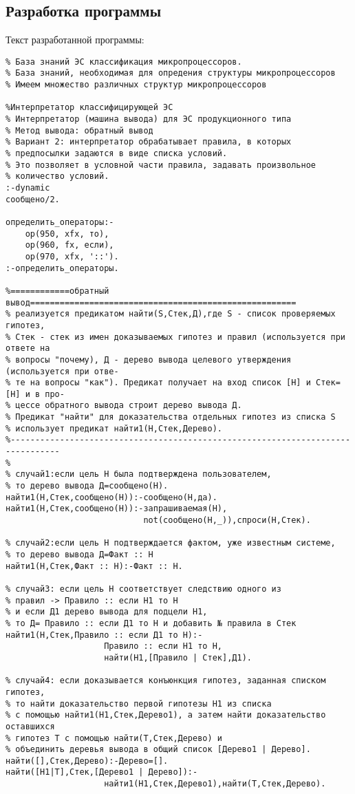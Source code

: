 \documentclass[a4paper,14pt]{extarticle}
\begin{document}
\subsection{Разработка программы}
Текст разработанной программы:
\begin{lstlisting}
% База знаний ЭС классификация микропроцессоров.
% База знаний, необходимая для опредения структуры микропроцессоров
% Имеем множество различных структур микропроцессоров

%Интерпретатор классифицирующей ЭС  
% Интерпретатор (машина вывода) для ЭС продукционного типа
% Метод вывода: обратный вывод
% Вариант 2: интерпретатор обрабатывает правила, в которых
% предпосылки задаются в виде списка условий.
% Это позволяет в условной части правила, задавать произвольное 
% количество условий.
:-dynamic
сообщено/2.

определить_операторы:-
	op(950, xfx, то),
	op(960, fx, если),
	op(970, xfx, '::').
:-определить_операторы.

%============обратный вывод======================================================
% реализуется предикатом найти(S,Стек,Д),где S - список проверяемых гипотез,
% Стек - стек из имен доказываемых гипотез и правил (используется при ответе на 
% вопросы "почему), Д - дерево вывода целевого утверждения (используется при отве-
% те на вопросы "как"). Предикат получает на вход список [Н] и Стек=[H] и в про-
% цессе обратного вывода строит дерево вывода Д.
% Предикат "найти" для доказательства отдельных гипотез из списка S
% использует предикат найти1(Н,Стек,Дерево).
%--------------------------------------------------------------------------------
%
% случай1:если цель Н была подтверждена пользователем,
% то дерево вывода Д=сообщено(Н).
найти1(H,Стек,сообщено(H)):-сообщено(H,да).
найти1(H,Стек,сообщено(H)):-запрашиваемая(H),
							not(сообщено(H,_)),спроси(H,Стек).
							
% случай2:если цель Н подтверждается фактом, уже известным системе,
% то дерево вывода Д=Факт :: H
найти1(H,Стек,Факт :: H):-Факт :: H.

% случай3: если цель Н соответствует следствию одного из 
% правил -> Правило :: если H1 то H
% и если Д1 дерево вывода для подцели Н1,
% то Д= Правило :: если Д1 то H и добавить № правила в Стек
найти1(H,Стек,Правило :: если Д1 то H):-
					Правило :: если H1 то H,
					найти(H1,[Правило | Стек],Д1).
	
% случай4: если доказывается конъюнкция гипотез, заданная списком гипотез, 
% то найти доказательство первой гипотезы Н1 из списка 
% с помощью найти1(H1,Стек,Дерево1), а затем найти доказательство оставшихся
% гипотез Т с помощью найти(T,Стек,Дерево) и
% объединить деревья вывода в общий список [Дерево1 | Дерево].
найти([],Стек,Дерево):-Дерево=[].
найти([H1|T],Стек,[Дерево1 | Дерево]):-
					найти1(H1,Стек,Дерево1),найти(T,Стек,Дерево).


\end{lstlisting}
\end{document}
